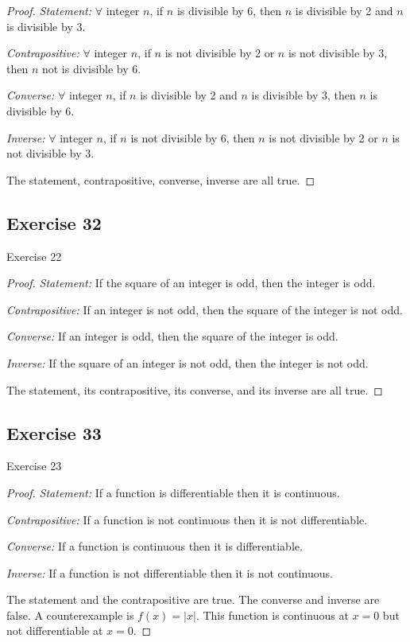 \documentclass[14pt]{extarticle}
\newcommand{\fa}{\forall}
\begin{document}
\begin{proof}
    {\it Statement:} $\fa$ integer $n$, if $n$ is divisible by 6, then $n$ is divisible by 2 and $n$ is divisible by 3.

        {\it Contrapositive:} $\fa$ integer $n$, if $n$ is not divisible by 2 or $n$ is not divisible by 3, then $n$ not is divisible by 6.

        {\it Converse:} $\fa$ integer $n$, if $n$ is divisible by 2 and $n$ is divisible by 3, then $n$ is divisible by 6.

        {\it Inverse:} $\fa$ integer $n$, if $n$ is not divisible by 6, then $n$ is not divisible by 2 or $n$ is not divisible by 3.

    The statement, contrapositive, converse, inverse are all true.
\end{proof}

\subsection{Exercise 32}
Exercise 22

\begin{proof}
    {\it Statement:} If the square of an integer is odd, then the integer is odd.

        {\it Contrapositive:} If an integer is not odd, then the square of the integer is not odd.

        {\it Converse:} If an integer is odd, then the square of the integer is odd.

        {\it Inverse:} If the square of an integer is not odd, then the integer is not odd.

    The statement, its contrapositive, its converse, and its
    inverse are all true.
\end{proof}

\subsection{Exercise 33}
Exercise 23

\begin{proof}
    {\it Statement:} If a function is differentiable then it is continuous.

        {\it Contrapositive:} If a function is not continuous then it is not differentiable.

        {\it Converse:} If a function is continuous then it is differentiable.

        {\it Inverse:} If a function is not differentiable then it is not continuous.

    The statement and the contrapositive are true. The converse and inverse are false. A counterexample is $f(x) = |x|$. This function is continuous at $x = 0$ but not differentiable at $x = 0$.
\end{proof}
\end{document}
